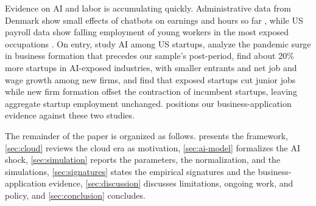 Evidence on AI and labor is accumulating quickly.
Administrative data from Denmark show small effects of chatbots on earnings and hours so far \citep{humlum2025large}, while US payroll data show falling employment of young workers in the most exposed occupations \citep{brynjolfsson2025canaries}.
On entry, \citet{dinlersoz2024starting} study AI among US startups, \citet{decker2023surging} analyze the pandemic surge in business formation that precedes our sample's post-period, \citet{bena2026prompted} find about 20\% more startups in AI-exposed industries, with smaller entrants and net job and wage growth among new firms, and \citet{gupta2026generative} find that exposed startups cut junior jobs while new firm formation offset the contraction of incumbent startups, leaving aggregate startup employment unchanged.
 positions our business-application evidence against these two studies.

The remainder of the paper is organized as follows.
 presents the framework, \cref{sec:cloud} reviews the cloud era as motivation, \cref{sec:ai-model} formalizes the AI shock, \cref{sec:simulation} reports the parameters, the normalization, and the simulations, \cref{sec:signatures} states the empirical signatures and the business-application evidence, \cref{sec:discussion} discusses limitations, ongoing work, and policy, and \cref{sec:conclusion} concludes.
